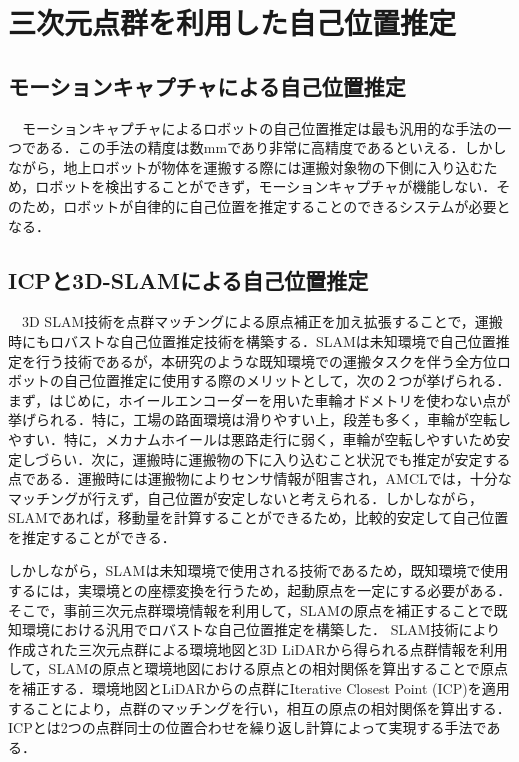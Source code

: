 \documentclass[a4jsme]{jsmepaper}
\begin{document}
\section{三次元点群を利用した自己位置推定}
\subsection{モーションキャプチャによる自己位置推定}

　モーションキャプチャによるロボットの自己位置推定は最も汎用的な手法の一つである．この手法の精度は数mmであり非常に高精度であるといえる．しかしながら，地上ロボットが物体を運搬する際には運搬対象物の下側に入り込むため，ロボットを検出することができず，モーションキャプチャが機能しない．そのため，ロボットが自律的に自己位置を推定することのできるシステムが必要となる．

\subsection{ICPと3D-SLAMによる自己位置推定}

　3D SLAM技術を点群マッチングによる原点補正を加え拡張することで，運搬時にもロバストな自己位置推定技術を構築する．SLAMは未知環境で自己位置推定を行う技術であるが，本研究のような既知環境での運搬タスクを伴う全方位ロボットの自己位置推定に使用する際のメリットとして，次の２つが挙げられる．まず，はじめに，ホイールエンコーダーを用いた車輪オドメトリを使わない点が挙げられる．特に，工場の路面環境は滑りやすい上，段差も多く，車輪が空転しやすい．特に，メカナムホイールは悪路走行に弱く，車輪が空転しやすいため安定しづらい．次に，運搬時に運搬物の下に入り込むこと状況でも推定が安定する点である．運搬時には運搬物によりセンサ情報が阻害され，AMCLでは，十分なマッチングが行えず，自己位置が安定しないと考えられる．しかしながら，SLAMであれば，移動量を計算することができるため，比較的安定して自己位置を推定することができる．

しかしながら，SLAMは未知環境で使用される技術であるため，既知環境で使用するには，実環境との座標変換を行うため，起動原点を一定にする必要がある．そこで，事前三次元点群環境情報を利用して，SLAMの原点を補正することで既知環境における汎用でロバストな自己位置推定を構築した．
SLAM技術により作成された三次元点群による環境地図と3D LiDARから得られる点群情報を利用して，SLAMの原点と環境地図における原点との相対関係を算出することで原点を補正する．環境地図とLiDARからの点群にIterative Closest Point (ICP)\cite{ICP}を適用することにより，点群のマッチングを行い，相互の原点の相対関係を算出する．ICPとは2つの点群同士の位置合わせを繰り返し計算によって実現する手法である．
\end{document}
